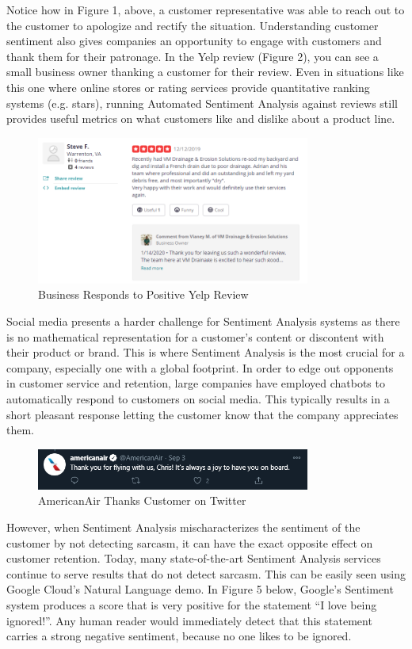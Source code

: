 \documentclass[conference]{IEEEtran}
\begin{document}
Notice how in Figure 1, above, a customer representative was able to reach out to the customer to apologize and rectify the situation. Understanding customer sentiment also gives companies an opportunity to engage with customers and thank them for their patronage. In the Yelp review (Figure 2), you can see a small business owner thanking a customer for their review.  Even in situations like this one where online stores or rating services provide quantitative ranking systems (e.g. stars), running Automated Sentiment Analysis against reviews still provides useful metrics on what customers like and dislike about a product line.\\

\begin{figure}[htbp]
\centerline{\includegraphics[width=9cm]{image 2.png}}
\caption{Business Responds to Positive Yelp Review}
\label{fig2}
\end{figure}

Social media presents a harder challenge for Sentiment Analysis systems as there is no mathematical representation for a customer’s content or discontent with their product or brand. This is where Sentiment Analysis is the most crucial for a company, especially one with a global footprint. In order to edge out opponents in customer service and retention, large companies have employed chatbots to automatically respond to customers on social media. This typically results in a short pleasant response letting the customer know that the company appreciates them.\\

\begin{figure}[htbp]
\centerline{\includegraphics[width=9cm]{image4.png}}
\caption{AmericanAir Thanks Customer on Twitter}
\label{fig3}
\end{figure}


However, when Sentiment Analysis mischaracterizes the sentiment of the customer by not detecting sarcasm, it can have the exact opposite effect on customer retention. Today, many state-of-the-art Sentiment Analysis services continue to serve results that do not detect sarcasm. This can be easily seen using Google Cloud’s Natural Language demo. In Figure 5 below, Google’s Sentiment system produces a score that is very positive for the statement “I love being ignored!”. Any human reader would immediately detect that this statement carries a strong negative sentiment, because no one likes to be ignored. \\
\end{document}
